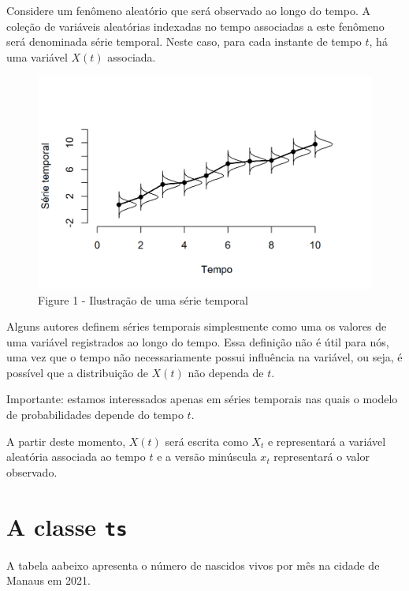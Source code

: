 \documentclass[
  letterpaper,
  DIV=11,
  numbers=noendperiod]{scrreprt}
\begin{document}
Considere um fenômeno aleatório que será observado ao longo do tempo. A
coleção de variáveis aleatórias indexadas no tempo associadas a este
fenômeno será denominada série temporal. Neste caso, para cada instante
de tempo \(t\), há uma variável \(X(t)\) associada.

\begin{figure}

{\centering \includegraphics{intro_files/figure-pdf/figura1-1.png}

}

\caption{Figure 1 - Ilustração de uma série temporal}

\end{figure}

Alguns autores definem séries temporais simplesmente como uma os valores
de uma variável registrados ao longo do tempo. Essa definição não é útil
para nós, uma vez que o tempo não necessariamente possui influência na
variável, ou seja, é possível que a distribuição de \(X(t)\) não dependa
de \(t\).

Importante: estamos interessados apenas em séries temporais nas quais o
modelo de probabilidades depende do tempo \(t\).

A partir deste momento, \(X(t)\) será escrita como \(X_t\) e
representará a variável aleatória associada ao tempo \(t\) e a versão
minúscula \(x_t\) representará o valor observado.

\hypertarget{a-classe-ts}{%
\section{\texorpdfstring{A classe
\texttt{ts}}{A classe ts}}\label{a-classe-ts}}

A tabela aabeixo apresenta o número de nascidos vivos por mês na cidade
de Manaus em 2021.
\end{document}
